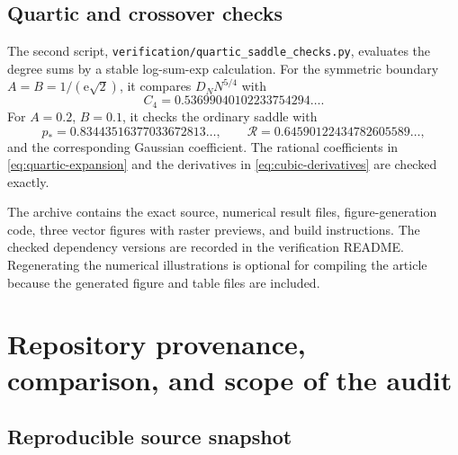 \documentclass[11pt,a4paper]{article}
\numberwithin{equation}{section}
\theoremstyle{definition}
\theoremstyle{remark}
\newcommand{\e}{\mathrm e}
\begin{document}
\subsection{Quartic and crossover checks}

The second script, \texttt{verification/quartic\_saddle\_checks.py},
evaluates the degree sums by a stable log-sum-exp calculation.
For the symmetric boundary $A=B=1/(\e\sqrt2)$, it compares
$D_NN^{5/4}$ with
\[
 C_4=0.53699040102233754294\ldots.
\]
For $A=0.2$, $B=0.1$, it checks the ordinary saddle with
\[
 p_*=0.83443516377033672813\ldots,\qquad
 \mathcal R=0.64590122434782605589\ldots,
\]
and the corresponding Gaussian coefficient.
The rational coefficients in \eqref{eq:quartic-expansion} and
the derivatives in \eqref{eq:cubic-derivatives} are checked exactly.

\begin{table}[htbp]
\centering
\small

\caption{Ratios predicted to approach one by
\cref{thm:exact-domain}. The quartic column uses the symmetric
boundary; the ordinary column uses $A=0.2$, $B=0.1$.}
\label{tab:saddles}
\end{table}

\begin{table}[htbp]
\centering
\small

\caption{The normalized quantity in \eqref{eq:quartic-crossover}
and its ratio to $\mathcal P(\tau,\eta)$ for three parameter pairs.
The checks use the leading profile; the first correction and
uniform remainder are proved analytically in \cref{sec:crossover}.}
\label{tab:crossover}
\end{table}

The archive contains the exact source, numerical result files,
figure-generation code, three vector figures with raster previews,
and build instructions. The checked dependency versions are
recorded in the verification README. Regenerating the numerical
illustrations is optional for compiling the article because the
generated figure and table files are included.

\FloatBarrier
\appendix
\section{Repository provenance, comparison, and scope of the audit}\label{app:provenance}

\subsection{Reproducible source snapshot}
\end{document}
